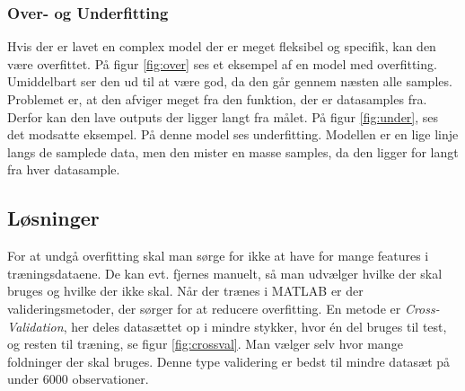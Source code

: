 \subsubsection{Over- og Underfitting}
Hvis der er lavet en complex model der er meget fleksibel og specifik, kan den være overfittet. På figur \ref{fig:over}\citep{fitting} ses et eksempel af en model med overfitting. Umiddelbart ser den ud til at være god, da den går gennem næsten alle samples. Problemet er, at den afviger meget fra den funktion, der er datasamples fra. Derfor kan den lave outputs der ligger langt fra målet. På figur \ref{fig:under}, ses det modsatte eksempel. På denne model ses underfitting. Modellen er en lige linje langs de samplede data, men den mister en masse samples, da den ligger for langt fra hver datasample.






\subsection{Løsninger}
For at undgå overfitting skal man sørge for ikke at have for mange features i træningsdataene. De kan evt. fjernes manuelt, så man udvælger hvilke der skal bruges og hvilke der ikke skal.
Når der trænes i MATLAB er der valideringsmetoder, der sørger for at reducere overfitting.
En metode er \textit{Cross-Validation}, her deles datasættet op i mindre stykker, hvor én del bruges til test, og resten til træning, se figur \ref{fig:crossval}. Man vælger selv hvor mange foldninger der skal bruges. Denne type validering er bedst til mindre datasæt på under 6000 observationer.

